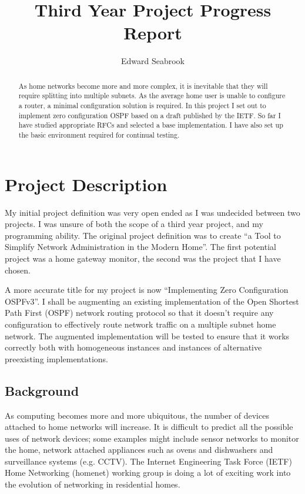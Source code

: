 \documentclass[12pt]{report}
\author{Edward Seabrook}
\title{Third Year Project Progress Report}
\begin{document}


\begin{abstract}
As home networks become more and more complex, it is inevitable that they will
require splitting into multiple subnets. As the average home user is unable to
configure a router, a minimal configuration solution is required. In this
project I set out to implement zero configuration OSPF based on a draft
published by the IETF. So far I have studied appropriate RFCs and selected a
base implementation. I have also set up the basic environment required for
continual testing.
\end{abstract}

\tableofcontents
\clearpage

\chapter{Project Description}
My initial project definition was very open ended as I was undecided between two
projects. I was unsure of both the scope of a third year project, and my
programming ability. The original project definition was to create ``a Tool to
Simplify Network Administration in the Modern Home''. The first potential
project was a home gateway monitor, the second was the project that I have
chosen. 

A more accurate title for my project is now ``Implementing Zero Configuration
OSPFv3''. I shall be augmenting an existing implementation of the Open Shortest
Path First (OSPF)  network routing
protocol so that it doesn't require any configuration to effectively route
network traffic on a multiple subnet home network. The augmented implementation
will be tested to ensure that it works correctly both with homogeneous instances
and instances of alternative preexisting implementations. 

\section{Background}
As computing becomes more and more ubiquitous, the number of devices attached to
home networks will increase. It is difficult to predict all the possible uses of
network devices; some examples might include sensor networks to monitor the
home, network attached appliances such as ovens and dishwashers and surveillance
systems (e.g. CCTV). The Internet Engineering Task Force (IETF)
 Home Networking (homenet)
 working group is doing a lot of exciting
work into the evolution of networking in residential homes. 
\end{document}
